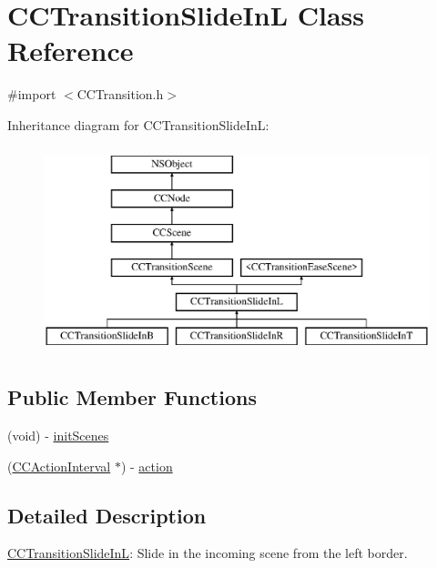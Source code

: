 \hypertarget{interface_c_c_transition_slide_in_l}{\section{C\-C\-Transition\-Slide\-In\-L Class Reference}
\label{interface_c_c_transition_slide_in_l}
}


{\ttfamily \#import $<$C\-C\-Transition.\-h$>$}

Inheritance diagram for C\-C\-Transition\-Slide\-In\-L\-:\begin{figure}[H]
\begin{center}
\leavevmode
\includegraphics[height=6.000000cm]{interface_c_c_transition_slide_in_l}
\end{center}
\end{figure}
\subsection*{Public Member Functions}
\begin{DoxyCompactItemize}
\item 
(void) -\/ \hyperlink{interface_c_c_transition_slide_in_l_a1040ca9a5abc535c40d8a1a5fd23f03c}{init\-Scenes}
\item 
(\hyperlink{class_c_c_action_interval}{C\-C\-Action\-Interval} $\ast$) -\/ \hyperlink{interface_c_c_transition_slide_in_l_a2e2c895ee9b481abba3deee4fadbb41d}{action}
\end{DoxyCompactItemize}


\subsection{Detailed Description}
\hyperlink{interface_c_c_transition_slide_in_l}{C\-C\-Transition\-Slide\-In\-L}\-: Slide in the incoming scene from the left border. 

